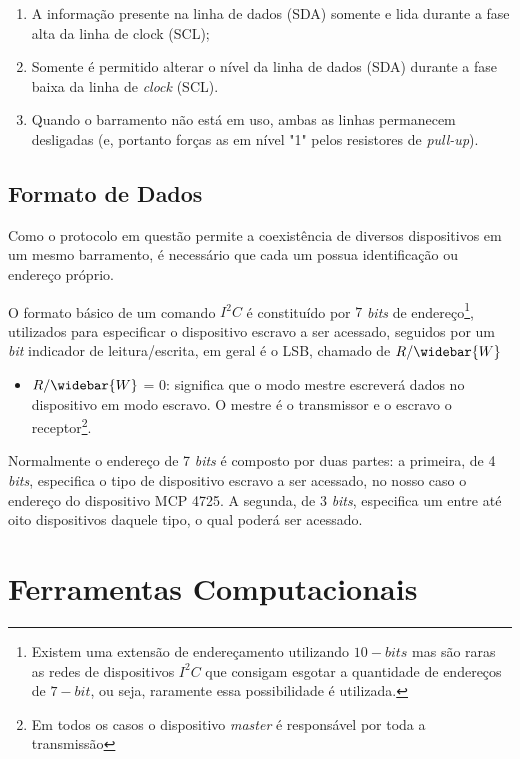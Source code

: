 	\begin{enumerate}
		\item A informação presente na linha de dados (SDA) somente 
		e lida durante a fase alta da linha de clock (SCL);
		\item Somente é permitido alterar o nível da linha de dados (SDA) durante a fase baixa da linha de \textit{clock} (SCL).
		\item Quando o barramento não está em uso, ambas as linhas permanecem desligadas (e, portanto forças as em nível "1" pelos resistores de \textit{pull-up}).
	\end{enumerate}

	\subsection{Formato de Dados}
	
		Como o protocolo em questão permite a coexistência de diversos dispositivos em um mesmo barramento, é necessário que cada um possua identificação ou endereço próprio.
		
		O formato básico de um comando $I^2C$ é constituído por $ 7 $ \textit{bits} de endereço\footnote{Existem uma extensão de endereçamento utilizando $10-bits$ mas são raras as redes de dispositivos $ I^2C $ que consigam esgotar a quantidade de endereços de $ 7-bit $, ou seja, raramente essa possibilidade é utilizada.}, utilizados para especificar o dispositivo escravo a ser acessado, seguidos por um \textit{bit} indicador de leitura/escrita, em geral é o LSB, chamado de $R/\widebar{W}$
		
		\begin{itemize}
			\item $ R/\widebar{W} $ = 0: significa que o modo mestre escreverá dados no dispositivo em modo escravo. O mestre é o transmissor e o escravo o receptor\footnote{Em todos os casos o dispositivo \textit{master} é responsável por toda a transmissão}. 
		\end{itemize}
		
		Normalmente o endereço de 7 \textit{bits} é composto por duas partes: a primeira, de 4 \textit{bits}, especifica o tipo de dispositivo escravo a ser acessado, no nosso caso o endereço do dispositivo MCP 4725. A segunda, de 3 \textit{bits}, especifica um entre até oito dispositivos daquele tipo, o qual poderá ser acessado.
		
		
	
	
	
\section{Ferramentas Computacionais}

